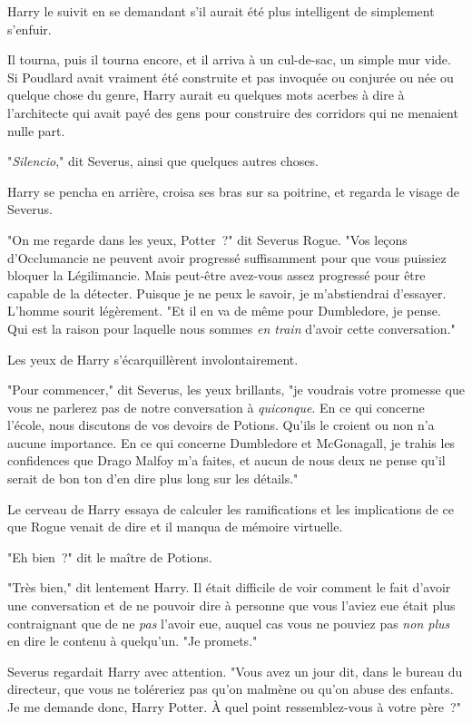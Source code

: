 Harry le suivit en se demandant s'il aurait été plus intelligent de simplement s'enfuir.

Il tourna, puis il tourna encore, et il arriva à un cul-de-sac, un simple mur vide. Si Poudlard avait vraiment été construite et pas invoquée ou conjurée ou née ou quelque chose du genre, Harry aurait eu quelques mots acerbes à dire à l'architecte qui avait payé des gens pour construire des corridors qui ne menaient nulle part.

"\emph{Silencio}," dit Severus, ainsi que quelques autres choses.

Harry se pencha en arrière, croisa ses bras sur sa poitrine, et regarda le visage de Severus.

"On me regarde dans les yeux, Potter~?" dit Severus Rogue. "Vos leçons d'Occlumancie ne peuvent avoir progressé suffisamment pour que vous puissiez bloquer la Légilimancie. Mais peut-être avez-vous assez progressé pour être capable de la détecter. Puisque je ne peux le savoir, je m'abstiendrai d'essayer. L'homme sourit légèrement. "Et il en va de même pour Dumbledore, je pense. Qui est la raison pour laquelle nous sommes \emph{en train} d'avoir cette conversation."

Les yeux de Harry s'écarquillèrent involontairement.

"Pour commencer," dit Severus, les yeux brillants, "je voudrais votre promesse que vous ne parlerez pas de notre conversation à \emph{quiconque}. En ce qui concerne l'école, nous discutons de vos devoirs de Potions. Qu'ils le croient ou non n'a aucune importance. En ce qui concerne Dumbledore et McGonagall, je trahis les confidences que Drago Malfoy m'a faites, et aucun de nous deux ne pense qu'il serait de bon ton d'en dire plus long sur les détails."

Le cerveau de Harry essaya de calculer les ramifications et les implications de ce que Rogue venait de dire et il manqua de mémoire virtuelle.

"Eh bien~?" dit le maître de Potions.

"Très bien," dit lentement Harry. Il était difficile de voir comment le fait d'avoir une conversation et de ne pouvoir dire à personne que vous l'aviez eue était plus contraignant que de ne \emph{pas} l'avoir eue, auquel cas vous ne pouviez pas \emph{non plus} en dire le contenu à quelqu'un. "Je promets."

Severus regardait Harry avec attention. "Vous avez un jour dit, dans le bureau du directeur, que vous ne toléreriez pas qu'on malmène ou qu'on abuse des enfants. Je me demande donc, Harry Potter. À quel point ressemblez-vous à votre père~?"

